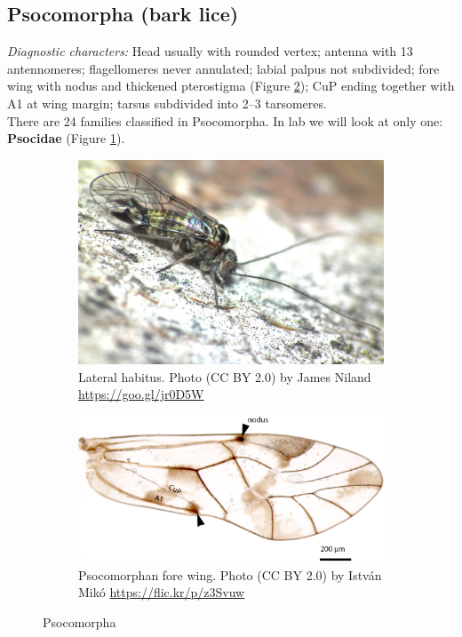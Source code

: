 \documentclass[letterpaper, 11pt]{article}
\begin{document}
\subsection{Psocomorpha (bark lice)}
\noindent{}\textit{Diagnostic characters:} Head usually with rounded vertex; antenna with 13 antennomeres; flagellomeres never annulated; labial palpus not subdivided; fore wing with nodus and thickened pterostigma (Figure \ref{fig:psocidwing}); CuP ending together with A1 at wing margin; tarsus subdivided into 2--3 tarsomeres.\\

\noindent{}There are 24 families classified in Psocomorpha. In lab we will look at only one: \textbf{Psocidae} (Figure \ref{fig:psocid}).

\begin{figure}[ht!]
 \centering
 \begin{subfigure}[ht!]{0.45\textwidth}
  \includegraphics[width=\textwidth]{PsocidHabitus}
  \caption{Lateral habitus. Photo (CC BY 2.0) by James Niland \url{https://goo.gl/jr0D5W}}
  \label{fig:psocid}
 \end{subfigure}
 \qquad
 \begin{subfigure}[ht!]{0.45\textwidth}
  \includegraphics[width=\textwidth]{PsocidWing}
  \caption{Psocomorphan fore wing. Photo (CC BY 2.0) by Istv\'an Mik\'o \url{https://flic.kr/p/z3Svuw}}
  \label{fig:psocidwing}
 \end{subfigure}
 \caption{Psocomorpha}\label{fig:psocids}
\end{figure}
\end{document}
